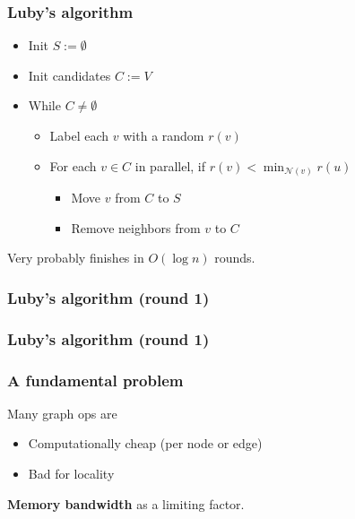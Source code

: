 \documentclass{beamer}
\begin{document}
\begin{frame}
  \frametitle{Luby's algorithm}

  \begin{itemize}
  \item Init $S := \emptyset$
  \item Init candidates $C := V$
  \item While $C \neq \emptyset$
    \begin{itemize}
    \item Label each $v$ with a random $r(v)$
    \item For each $v \in C$ in parallel, if $r(v) <
      \min_{\mathcal{N}(v)} r(u)$
      \begin{itemize}
      \item Move $v$ from $C$ to $S$
      \item Remove neighbors from $v$ to $C$
      \end{itemize}
    \end{itemize}
  \end{itemize}
  Very probably finishes in $O(\log n)$ rounds.
\end{frame}


\begin{frame}
  \frametitle{Luby's algorithm (round 1)}

  \begin{center}
    \begin{tikzpicture}
      
    \end{tikzpicture}
  \end{center}
\end{frame}


\begin{frame}
  \frametitle{Luby's algorithm (round 1)}

  \begin{center}
    \begin{tikzpicture}
      
    \end{tikzpicture}
  \end{center}
\end{frame}


\begin{frame}
  \frametitle{A fundamental problem}

  Many graph ops are
  \begin{itemize}
  \item Computationally cheap (per node or edge)
  \item Bad for locality
  \end{itemize}
  {\bf Memory bandwidth} as a limiting factor.
\end{frame}
\end{document}
